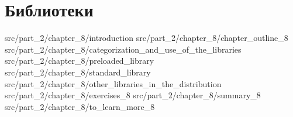 \chapter{Библиотеки}
\label{chpt:libraries}

 {src/part_2/chapter_8/introduction}
 {src/part_2/chapter_8/chapter_outline_8}
 {src/part_2/chapter_8/categorization_and_use_of_the_libraries}
 {src/part_2/chapter_8/preloaded_library}
 {src/part_2/chapter_8/standard_library}
 {src/part_2/chapter_8/other_libraries_in_the_distribution}
 {src/part_2/chapter_8/exercises_8}
 {src/part_2/chapter_8/summary_8}
 {src/part_2/chapter_8/to_learn_more_8}